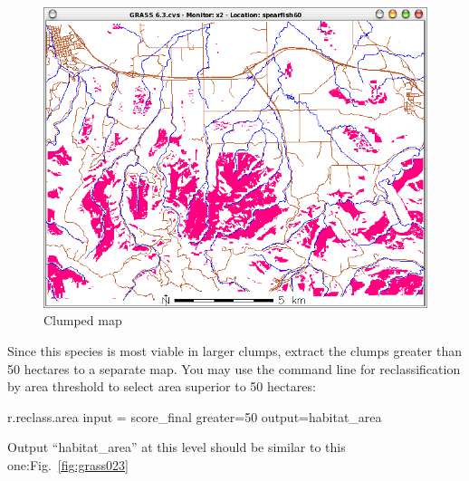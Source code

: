 \begin{figure}[htbp]
   \centering
   \includegraphics[scale=0.35]{grass022.png}
   \caption{Clumped map}
   \label{fig:grass022}
\end{figure}


Since this species is most viable in larger clumps, extract the clumps greater than 50 hectares to a separate map. You may use the command line for reclassification by area threshold to select area superior to 50 hectares:

\begin{smallverbatim}
r.reclass.area input = score_final greater=50 
 output=habitat_area
\end{smallverbatim}

Output ``habitat\_area'' at this level should be similar to this one:Fig.~\ref{fig:grass023}

